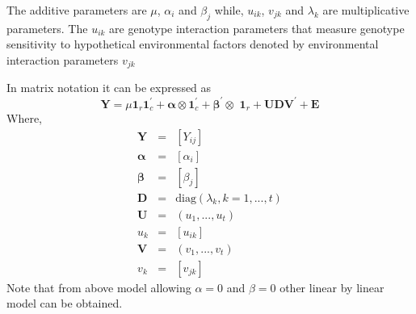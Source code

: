  The additive parameters are $\mu$, $\alpha_i$ and $\beta_j$ while, $u_{ik}$, $v_{jk}$ and $\lambda_k$ are multiplicative parameters. The $u_{ik}$ are genotype interaction parameters that measure genotype sensitivity to hypothetical environmental factors denoted by environmental interaction parameters $v_{jk}$
 
 In matrix notation it can be expressed as
\begin{equation}
	\textbf{Y}=\mu\textbf{1}_r\textbf{1}_c^\prime+\bm{\alpha}\otimes \textbf{1}_c^\prime+\bm{\beta}^\prime\otimes\textbf{ 1}_r+\textbf{U}\textbf{D}\textbf{V}^\prime +\textbf{E} 
\end{equation}
Where,
\begin{eqnarray}
\textbf{Y} &=&[Y_{ij}] \nonumber \\
\bm{\alpha}&=&[\alpha_i] \nonumber \\
\bm{\beta }&=&[\beta_j] \nonumber\\
\textbf{D} &=& \text{diag}(\lambda_k, k=1,...,t) \nonumber \\
\textbf{U} &=& (u_1,...,u_t) \nonumber \\
u_{k}      &=&[u_{ik}] \nonumber \\
\textbf{V} &=& (v_1,...,v_t) \nonumber \\
v_k        &=&[v_{jk}]  \nonumber
\end{eqnarray}
Note that from above model allowing $\alpha=0$ and $\beta=0$ other linear by linear model can be obtained.

